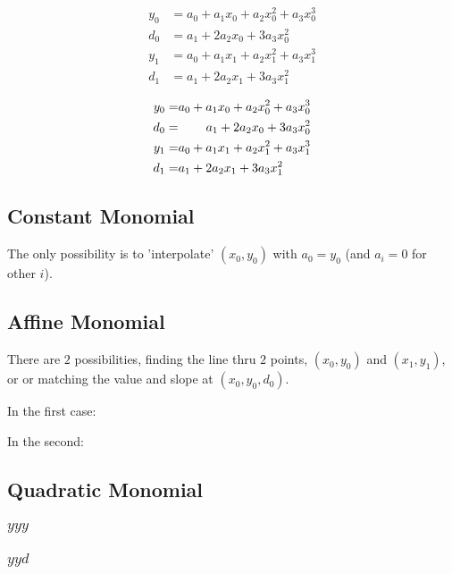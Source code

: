 \begin{align}\label{eq:hermite-eqns}
 y_0 & = a_0 + a_1 x_0 + a_2 x_0^2 + a_3 x_0^3 \\
 d_0 & = a_1 + 2 a_2 x_0 + 3 a_3 x_0^2 \nonumber \\
 y_1 & = a_0 + a_1 x_1 + a_2 x_1^2 + a_3 x_1^3 \nonumber \\
 d_1 & = a_1 + 2 a_2 x_1 + 3 a_3 x_1^2 \nonumber 
\end{align}

\begin{align}
 y_0 = &a_0 + a_1 x_0 + a_2 x_0^2 + a_3 x_0^3 \\
 d_0 = &\specialcell{\hfill a_1 + 2 a_2 x_0 + 3 a_3 x_0^2} \nonumber \\
 y_1 = &a_0 + a_1 x_1 + a_2 x_1^2 + a_3 x_1^3 \nonumber \\
 d_1 = &\specialcell{{\hfill a_1 + 2 a_2 x_1 + 3 a_3 x_1^2}} \nonumber 
\end{align}

\subsection{Constant Monomial}

The only possibility is to 'interpolate' $(x_0,y_0)$ with
$a_0 = y_0$ (and $a_i = 0$ for other $i$). 

\subsection{Affine Monomial}

There are $2$ possibilities, finding the line thru $2$ points,
$(x_0,y_0)$ and $(x_1,y_1)$, or or matching the value and slope at
$(x_0,y_0,d_0)$.

In the first case:


In the second:



\subsection{Quadratic Monomial}

\subsubsection{$yyy$}



\subsubsection{$yyd$}

